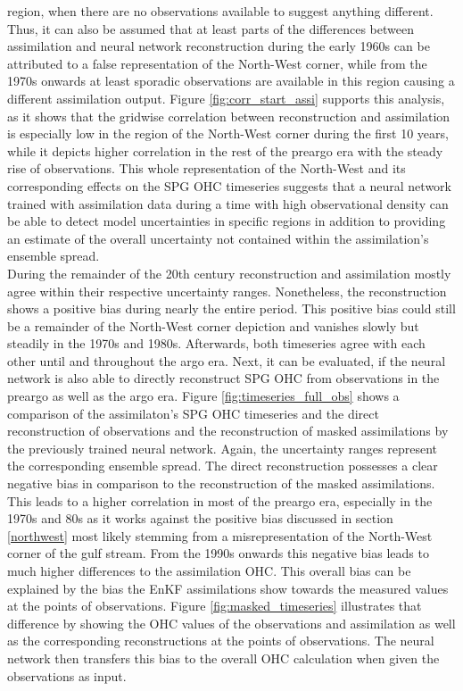 \documentclass[11pt,a4paper]{scrreprt}	%
\begin{document}
region, when there are no observations available to suggest anything different. Thus, it can also be assumed that at least parts of the differences between assimilation and neural network reconstruction during the early 1960s can be attributed to a false representation of the North-West corner, while from the 1970s onwards at least sporadic observations are available in this region causing a different assimilation output. Figure \ref{fig:corr_start_assi} supports this analysis, as it shows that the gridwise correlation between reconstruction and assimilation is especially low in the region of the North-West corner during the first 10 years, while it depicts higher correlation in the rest of the preargo era with the steady rise of observations. This whole representation of the North-West and its corresponding effects on the SPG OHC timeseries suggests that a neural network trained with assimilation data during a time with high observational density can be able to detect model uncertainties in specific regions in addition to providing an estimate of the overall uncertainty not contained within the assimilation's ensemble spread. \\
	During the remainder of the 20th century reconstruction and assimilation mostly agree within their respective uncertainty ranges. Nonetheless, the reconstruction shows a positive bias during nearly the entire period. This positive bias could still be a remainder of the North-West corner depiction and vanishes slowly but steadily in the 1970s and 1980s. Afterwards, both timeseries agree with each other until and throughout the argo era. Next, it can be evaluated, if the neural network is also able to directly reconstruct SPG OHC from observations in the preargo as well as the argo era. Figure \ref{fig:timeseries_full_obs} shows a comparison of the assimilaton's SPG OHC timeseries and the direct reconstruction of observations and the reconstruction of masked assimilations by the previously trained neural network. Again, the uncertainty ranges represent the corresponding ensemble spread. The direct reconstruction possesses a clear negative bias in comparison to the reconstruction of the masked assimilations. This leads to a higher correlation in most of the preargo era, especially in the 1970s and 80s as it works against the positive bias discussed in section \ref{northwest} most likely stemming from a misrepresentation of the North-West corner of the gulf stream. From the 1990s onwards this negative bias leads to much higher differences to the assimilation OHC. This overall bias can be explained by the bias the EnKF assimilations show towards the measured values at the points of observations. Figure \ref{fig:masked_timeseries} illustrates that difference by showing the OHC values of the observations and assimilation as well as the corresponding reconstructions at the points of observations. The neural network then transfers this bias to the overall OHC calculation when given the observations as input. 
	
\end{document}
